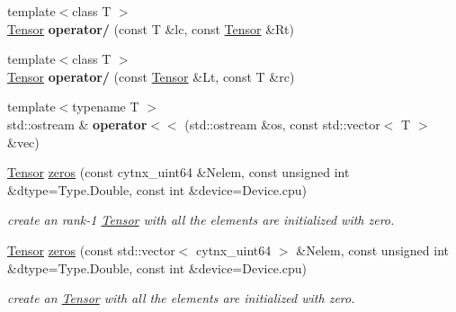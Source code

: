 \begin{DoxyCompactItemize}
{\footnotesize template$<$class T $>$ }\\\hyperlink{classcytnx_1_1Tensor}{Tensor} {\bfseries operator/} (const T \&lc, const \hyperlink{classcytnx_1_1Tensor}{Tensor} \&Rt)
\item 
\mbox{\label{namespacecytnx_aa0d1098af300b504134953d480d0f780}} 
{\footnotesize template$<$class T $>$ }\\\hyperlink{classcytnx_1_1Tensor}{Tensor} {\bfseries operator/} (const \hyperlink{classcytnx_1_1Tensor}{Tensor} \&Lt, const T \&rc)
\item 
\mbox{\label{namespacecytnx_ab079a9e930c0508a63311bc8624c498f}} 
{\footnotesize template$<$typename T $>$ }\\std\+::ostream \& {\bfseries operator$<$$<$} (std\+::ostream \&os, const std\+::vector$<$ T $>$ \&vec)
\end{DoxyCompactItemize}
\textbf{ }\par
\begin{DoxyCompactItemize}
\item 
\hyperlink{classcytnx_1_1Tensor}{Tensor} \hyperlink{namespacecytnx_ab8a79a03fb0465f3eb2641017f3f1755}{zeros} (const cytnx\+\_\+uint64 \&Nelem, const unsigned int \&dtype=Type.\+Double, const int \&device=Device.\+cpu)
\begin{DoxyCompactList}\small\item\em create an rank-\/1 \hyperlink{classcytnx_1_1Tensor}{Tensor} with all the elements are initialized with zero. \end{DoxyCompactList}\item 
\hyperlink{classcytnx_1_1Tensor}{Tensor} \hyperlink{namespacecytnx_ad53947bd87534866b11080f9898d2a53}{zeros} (const std\+::vector$<$ cytnx\+\_\+uint64 $>$ \&Nelem, const unsigned int \&dtype=Type.\+Double, const int \&device=Device.\+cpu)
\begin{DoxyCompactList}\small\item\em create an \hyperlink{classcytnx_1_1Tensor}{Tensor} with all the elements are initialized with zero. \end{DoxyCompactList}\end{DoxyCompactItemize}

